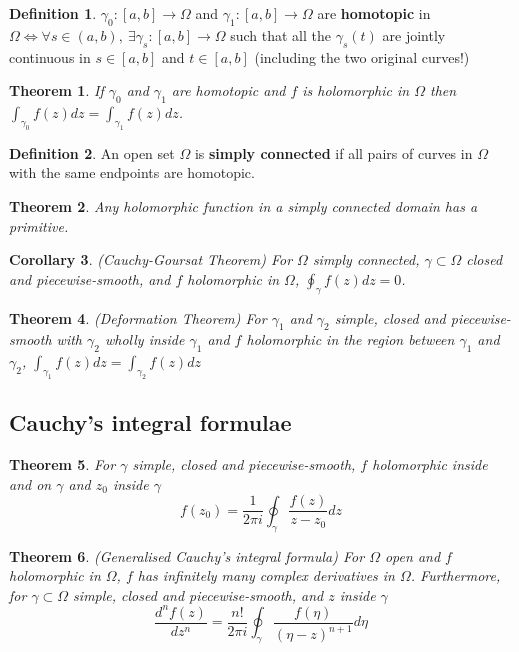 \documentclass[12pt]{article}
\newtheorem{thm}{Theorem}[section]
\newtheorem{cor}[thm]{Corollary}
\theoremstyle{definition}
\newtheorem{defn}{Definition}[section]
\begin{document}
\begin{defn}
  $\gamma_0 : [a, b] \to \Omega$ and $\gamma_1 : [a, b] \to \Omega$ are \textbf{homotopic} in  $\Omega \iff \forall s \in (a, b),\ \exists \gamma_s : [a, b] \to \Omega$ such that all the $\gamma_s(t)$ are jointly continuous in $s \in [a, b]$ and $t \in [a, b]$ (including the two original curves!)
\end{defn}

\begin{thm}
  If $\gamma_0$ and $\gamma_1$ are homotopic and $f$ is holomorphic in $\Omega$ then $\int_{\gamma_0}f(z)dz = \int_{\gamma_1}f(z)dz$.
\end{thm}

\begin{defn}
  An open set $\Omega$ is \textbf{simply connected} if all pairs of curves in $\Omega$ with the same endpoints are homotopic.
\end{defn}

\begin{thm}
  Any holomorphic function in a simply connected domain has a primitive.
\end{thm}

\begin{cor}
  (Cauchy-Goursat Theorem)
  For $\Omega$ simply connected, $\gamma \subset \Omega$ closed and piecewise-smooth, and $f$ holomorphic in $\Omega$, $\oint_{\gamma}f(z)dz = 0$.
\end{cor}

\begin{thm}
  (Deformation Theorem)
  For $\gamma_1$ and $\gamma_2$ simple, closed and piecewise-smooth with $\gamma_2$ wholly inside $\gamma_1$ and $f$ holomorphic in the region between $\gamma_1$ and $\gamma_2$, $\int_{\gamma_1}f(z)dz = \int_{\gamma_2}f(z)dz$
\end{thm}

\subsection{Cauchy's integral formulae}

\begin{thm}
  For $\gamma$ simple, closed and piecewise-smooth, $f$ holomorphic inside and on $\gamma$ and $z_0$ inside $\gamma$
  $$f(z_0) = \frac{1}{2\pi i}\oint_{\gamma}\frac{f(z)}{z - z_0}dz$$
\end{thm}

\begin{thm}
  (Generalised Cauchy's integral formula)
  For $\Omega$ open and $f$ holomorphic in $\Omega$, $f$ has infinitely many complex derivatives in $\Omega$.
  Furthermore, for $\gamma \subset \Omega$ simple, closed and piecewise-smooth, and $z$ inside $\gamma$
  $$\frac{d^nf(z)}{dz^n} = \frac{n!}{2\pi i}\oint_{\gamma}\frac{f(\eta)}{(\eta - z)^{n + 1}}d\eta$$
\end{thm}
\end{document}
